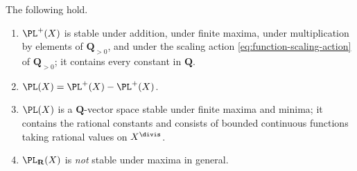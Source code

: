 \begin{lemma}
\label{lem:ch34-pl-lattice}
The following hold.
\begin{enumerate}
\item\label{itm:ch34-pl:cone}
  $\PL^+(X)$ is stable under addition, under finite maxima, under
  multiplication by elements of $\mathbf Q_{>0}$, and under the scaling
  action \eqref{eq:function-scaling-action} of $\mathbf Q_{>0}$; it
  contains every constant in $\mathbf Q$.
\item\label{itm:ch34-pl:difference}
  $\PL(X)=\PL^+(X)-\PL^+(X)$.
\item\label{itm:ch34-pl:lattice}
  $\PL(X)$ is a $\mathbf Q$-vector space stable under finite maxima and
  minima; it contains the rational constants and consists of bounded
  continuous functions taking rational values on $X^{\divis}$.
\item\label{itm:ch34-pl:realnotlattice}
  $\PL_{\mathbf R}(X)$ is \emph{not} stable under maxima in general.
\end{enumerate}
\par
\end{lemma}

